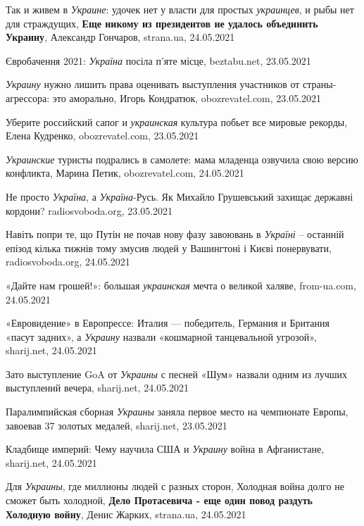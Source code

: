  
 
 
 
 

Так и живем в \emph{Украине}: удочек нет у власти для простых \emph{украинцев},
и рыбы нет для страждущих, \textbf{Еще никому из президентов не удалось объединить
Украину}, Александр Гончаров, strana.ua, 24.05.2021

Євробачення 2021: \emph{Україна} посіла п'яте місце, beztabu.net, 23.05.2021

\emph{Украину} нужно лишить права оценивать выступления участников от
страны-агрессора: это аморально, Игорь Кондратюк, obozrevatel.com, 23.05.2021

Уберите российский сапог и \emph{украинская} культура побьет все мировые
рекорды, Елена Кудренко, obozrevatel.com, 23.05.2021

\emph{Украинские} туристы подрались в самолете: мама младенца озвучила свою
версию конфликта, Марина Петик, obozrevatel.com, 24.05.2021

Не просто \emph{Україна}, а \emph{Україна}-Русь. Як Михайло Грушевський захищає
державні кордони?  radiosvoboda.org, 23.05.2021

Навіть попри те, що Путін не почав нову фазу завоювань в \emph{Україні} –
останній епізод кілька тижнів тому змусив людей у Вашингтоні і Києві
понервувати,
radiosvoboda.org, 24.05.2021

«Дайте нам грошей!»: большая \emph{украинская} мечта о великой халяве, from-ua.com, 24.05.2021

«Евровидение» в Европрессе: Италия — победитель, Германия и Британия  «пасут
задних», а \emph{Украину} назвали «кошмарной танцевальной угрозой», sharij.net,
24.05.2021

Зато выступление GoA от \emph{Украины} с песней «Шум» назвали одним из лучших
выступлений вечера,
sharij.net, 24.05.2021

Паралимпийская сборная \emph{Украины} заняла первое место на чемпионате Европы,
завоевав 37 золотых медалей, sharij.net, 23.05.2021

Кладбище империй: Чему научила США и \emph{Украину} война в Афганистане,
sharij.net, 24.05.2021

Для \emph{Украины}, где миллионы людей с разных сторон, Холодная война долго не сможет быть холодной,
\textbf{Дело Протасевича - еще один повод раздуть Холодную войну}, Денис Жарких, strana.ua, 24.05.2021


